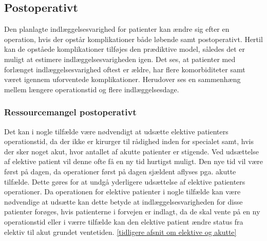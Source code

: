 \subsection{Postoperativt}
Den planlagte indlæggelsesvarighed for patienter kan ændre sig efter en operation, hvis der opstår komplikationer både løbende samt postoperativt. Hertil kan de opståede komplikationer tilføjes den prædiktive model, således det er muligt at estimere indlæggelsesvarigheden igen. Det ses, at patienter med forlænget indlæggelsesvarighed oftest er ældre, har flere komorbiditeter samt været igennem uforventede komplikationer.\cite{Krell2014} Herudover ses en sammenhæng mellem længere operationstid og flere indlæggelsesdage.\cite{Kjeldsen2015b}



\subsubsection{Ressourcemangel postoperativt}
Det kan i nogle tilfælde være nødvendigt at udsætte elektive patienters operationstid, da der ikke er kirurger til rådighed inden for specialet samt, hvis der sker noget akut, hvor antallet af akutte patienter er stigende. Ved udsættelse af elektive patient vil denne ofte få en ny tid hurtigst muligt. Den nye tid vil være først på dagen, da operationer først på dagen sjældent aflyses pga. akutte tilfælde. Dette gøres for at undgå yderligere udsættelse af elektive patienters operationer. Da operationen for elektive patienter i nogle tilfælde kan være nødvendige at udsætte kan dette betyde at indlæggelsesvarigheden for disse patienter forøges, hvis patienterne i forvejen er indlagt, da de skal vente på en ny operationstid eller i værre tilfælde kan den elektive patient ændre status fra elektiv til akut grundet ventetiden. \ref{tidligere afsnit om elektive og akutte}







